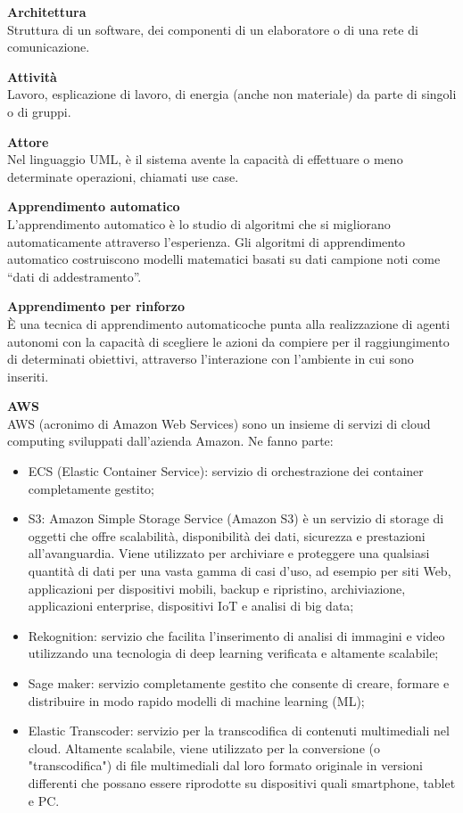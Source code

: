 \documentclass[a4paper, oneside, openany, dvipsnames, table, 12pt]{article}
\begin{document}
\textbf{Architettura} \\
Struttura di un software, dei componenti di un elaboratore o di una rete di comunicazione.

\textbf{Attività} \\
Lavoro, esplicazione di lavoro, di energia (anche non materiale) da parte di singoli o di gruppi.

\textbf{Attore} \\
Nel linguaggio UML, è il sistema avente la capacità di effettuare o meno determinate operazioni, chiamati use case. 

\label{par:appr_auto}
\textbf{Apprendimento automatico} \\ 
L’apprendimento automatico è lo studio di algoritmi che si migliorano automaticamente attraverso l’esperienza. Gli algoritmi di apprendimento automatico costruiscono modelli matematici basati su dati campione noti come “dati di addestramento”.

\textbf{Apprendimento per rinforzo}\\
È una tecnica di apprendimento automatico\glo che punta alla realizzazione di agenti autonomi con la capacità di scegliere le azioni da compiere per il raggiungimento di determinati obiettivi, attraverso l’interazione con l’ambiente in cui sono inseriti.	

\textbf{AWS} \\
AWS (acronimo di Amazon Web Services) sono un insieme di servizi di cloud computing sviluppati dall'azienda Amazon. Ne fanno parte: 
\begin{itemize}
\item ECS (Elastic Container Service): servizio di orchestrazione dei container completamente gestito;
\item S3: Amazon Simple Storage Service (Amazon S3) è un servizio di storage di oggetti che offre scalabilità, disponibilità dei dati, sicurezza e prestazioni all'avanguardia. Viene utilizzato per archiviare e proteggere una qualsiasi quantità di dati per una vasta gamma di casi d'uso, ad esempio per siti Web, applicazioni per dispositivi mobili, backup e ripristino, archiviazione, applicazioni enterprise, dispositivi IoT e analisi di big data;
\item Rekognition: servizio che facilita l'inserimento di analisi di immagini e video utilizzando una tecnologia di deep learning verificata e altamente scalabile;
\item Sage maker: servizio completamente gestito che consente di creare, formare e distribuire in modo rapido modelli di machine learning (ML);
\item Elastic Transcoder: servizio per la transcodifica di contenuti multimediali nel cloud. Altamente scalabile, viene utilizzato per la conversione (o "transcodifica") di file multimediali dal loro formato originale in versioni differenti che possano essere riprodotte su dispositivi quali smartphone, tablet e PC.
\end{itemize}
\end{document}
